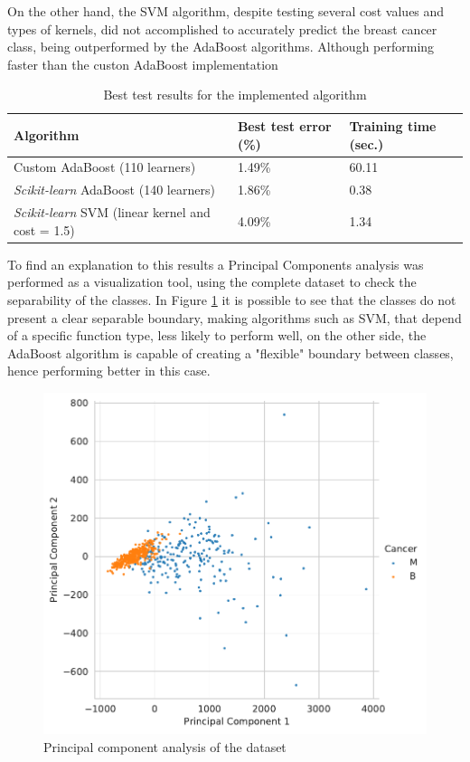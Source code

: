 \documentclass[11pt,twocolumn,letterpaper]{article}
\begin{document}
On the other hand, the SVM algorithm, despite testing several cost values and types of kernels, did not accomplished to accurately predict the breast cancer class, being outperformed by the AdaBoost algorithms. Although performing faster than the custon AdaBoost implementation

\begin{table}[h]
	\begin{center}
		\begin{tabular}{|p{4cm}|p{1.5cm}|p{1.5cm}|}
			\hline
			Algorithm & Best test error (\%) & Training time (sec.) \\
			\hline\hline
			Custom AdaBoost (110 learners) & 1.49\% & 60.11\\
			\textit{Scikit-learn} AdaBoost (140 learners)& 1.86\% & 0.38\\
			\textit{Scikit-learn} SVM (linear kernel and cost = 1.5) & 4.09\% & 1.34\\
			\hline
		\end{tabular}
	\end{center}
	\caption{Best test results for the implemented algorithm}
	\label{table:results}
\end{table}

To find an explanation to this results a Principal Components analysis was performed as a visualization tool, using the complete dataset to check the separability of the classes. In Figure \ref{fig:pca} it is possible to see that the classes do not present a clear separable boundary, making algorithms such as SVM, that depend of a specific function type, less likely to perform well, on the other side, the AdaBoost algorithm is capable of creating a "flexible" boundary between classes, hence performing better in this case.

\begin{figure}[h]
	\begin{center}
		\includegraphics[width=1.0\linewidth]{pca.pdf}
	\end{center}
	\caption{Principal component analysis of the dataset}
	\label{fig:pca}
\end{figure}
\end{document}

